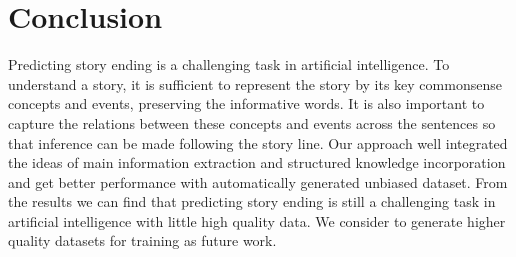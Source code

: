 \section{Conclusion}

Predicting story ending is a challenging task in artificial intelligence.
To understand a story, it is sufficient to represent the story by its key
commonsense concepts and events, preserving the informative words.
It is also important to capture the relations between these concepts and
events across the sentences so that inference can be made following
the story line. 
Our approach well integrated the ideas of main information extraction and 
structured knowledge incorporation and get better performance with automatically 
generated unbiased dataset. From the results we can find that 
predicting story ending is still a challenging task 
in artificial intelligence with little high quality data.
We consider to generate higher quality datasets for training as future work.